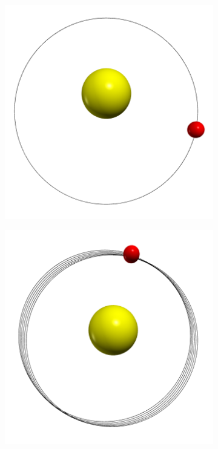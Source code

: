 \documentclass[12pt,ngerman,american]{iopart}
\begin{document}
\begin{figure}[htb]
	\centering
	\begin{subfigure}[c]{0.22\textwidth}
		\includegraphics[width=\textwidth]{figs/a0T5dt20.png}
		\caption{\label{fig:MercuryOrbit-a6-small}}
	\end{subfigure}
	\begin{subfigure}[c]{0.22\textwidth}
		\includegraphics[width=\textwidth]{figs/a6T5dt20.png}

\end{subfigure}
\end{figure}
\end{document}
